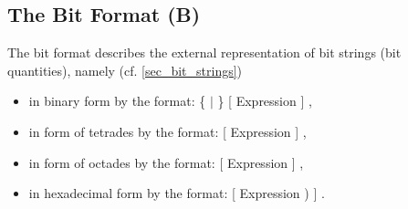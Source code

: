 \subsection{The Bit Format (B)}    %
\label{sec_dation_b_format}

\begin{grammarframe}

\end{grammarframe}

The bit format describes the external representation of bit strings (bit
quantities), namely (cf. \ref{sec_bit_strings})
\begin{itemize}
\item in binary form by the format: \{  $\mid$  \} 
		[ \code{(} Expression \code{)} ] ,
\item in form of tetrades by the format:  [ \code{(} Expression \code{)} ] ,
\item in form of octades by the format:  [ \code{(} Expression \code{)} ] ,
\item in hexadecimal form by the format:  [ \code{(} Expression \code{}) ] .
\end{itemize}

